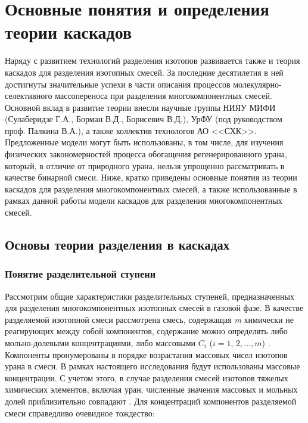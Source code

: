 \chapter{Основные понятия и определения теории каскадов}\label{ch2_theory}

Наряду с развитием технологий разделения изотопов развивается также и теория каскадов для разделения изотопных смесей. За последние десятилетия в ней достигнуты значительные успехи в части описания процессов молекулярно-селективного массопереноса при разделения многокомпонентных смесей. Основной вклад в развитие теории внесли научные группы НИЯУ МИФИ (Сулаберидзе Г.А., Борман В.Д., Борисевич В.Д.), УрФУ (под руководством проф. Палкина В.А.), а также коллектив технологов АО <<СХК>>. Предложенные модели могут быть использованы, в том числе, для изучения физических закономерностей процесса обогащения регенерированного урана, который, в отличие от природного урана, нельзя упрощенно рассматривать в качестве бинарной смеси.
Ниже, кратко приведены основные понятия из теории каскадов для разделения многокомпонентных смесей, а также использованные в рамках данной работы модели каскадов для разделения многокомпонентных смесей.

\section{Основы теории разделения в каскадах}


\subsection{Понятие разделительной ступени}

Рассмотрим общие характеристики разделительных ступеней, предназначенных для разделения многокомпонентных изотопных смесей в газовой фазе. В качестве разделяемой изотопной смеси рассмотрена смесь, содержащая \textit{m} химически не реагирующих между собой компонентов, содержание можно определять либо мольно-долевыми концентрациями, либо массовыми $C_{i}$ ($i=1,\, 2,...,m$) \cite{sulaberidzeTeoriyaKaskadovDlya2011}. Компоненты пронумерованы в порядке возрастания массовых чисел изотопов урана в смеси. В рамках настоящего исследования будут использованы массовые концентрации. С учетом этого, в случае разделения смесей изотопов тяжелых химических элементов, включая уран, численные значения массовых и мольных долей приблизительно совпадают \cite{sulaberidzeTeoriyaKaskadovDlya2011}.  Для концентраций компонентов разделяемой смеси справедливо очевидное тождество:

